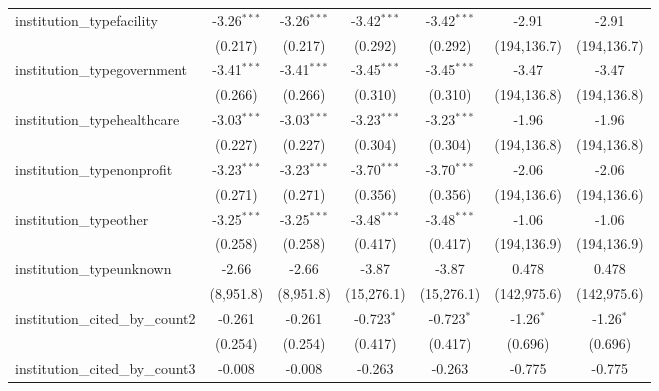 \begin{tabular}{lcccccc}
   institution\_typefacility             & -3.26$^{***}$ & -3.26$^{***}$ & -3.42$^{***}$ & -3.42$^{***}$ & -2.91        & -2.91\\   
                                         & (0.217)       & (0.217)       & (0.292)       & (0.292)       & (194,136.7)  & (194,136.7)\\   
   institution\_typegovernment           & -3.41$^{***}$ & -3.41$^{***}$ & -3.45$^{***}$ & -3.45$^{***}$ & -3.47        & -3.47\\   
                                         & (0.266)       & (0.266)       & (0.310)       & (0.310)       & (194,136.8)  & (194,136.8)\\   
   institution\_typehealthcare           & -3.03$^{***}$ & -3.03$^{***}$ & -3.23$^{***}$ & -3.23$^{***}$ & -1.96        & -1.96\\   
                                         & (0.227)       & (0.227)       & (0.304)       & (0.304)       & (194,136.8)  & (194,136.8)\\   
   institution\_typenonprofit            & -3.23$^{***}$ & -3.23$^{***}$ & -3.70$^{***}$ & -3.70$^{***}$ & -2.06        & -2.06\\   
                                         & (0.271)       & (0.271)       & (0.356)       & (0.356)       & (194,136.6)  & (194,136.6)\\   
   institution\_typeother                & -3.25$^{***}$ & -3.25$^{***}$ & -3.48$^{***}$ & -3.48$^{***}$ & -1.06        & -1.06\\   
                                         & (0.258)       & (0.258)       & (0.417)       & (0.417)       & (194,136.9)  & (194,136.9)\\   
   institution\_typeunknown              & -2.66         & -2.66         & -3.87         & -3.87         & 0.478        & 0.478\\   
                                         & (8,951.8)     & (8,951.8)     & (15,276.1)    & (15,276.1)    & (142,975.6)  & (142,975.6)\\   
   institution\_cited\_by\_count2        & -0.261        & -0.261        & -0.723$^{*}$  & -0.723$^{*}$  & -1.26$^{*}$  & -1.26$^{*}$\\   
                                         & (0.254)       & (0.254)       & (0.417)       & (0.417)       & (0.696)      & (0.696)\\   
   institution\_cited\_by\_count3        & -0.008        & -0.008        & -0.263        & -0.263        & -0.775       & -0.775\\   

\end{tabular}
